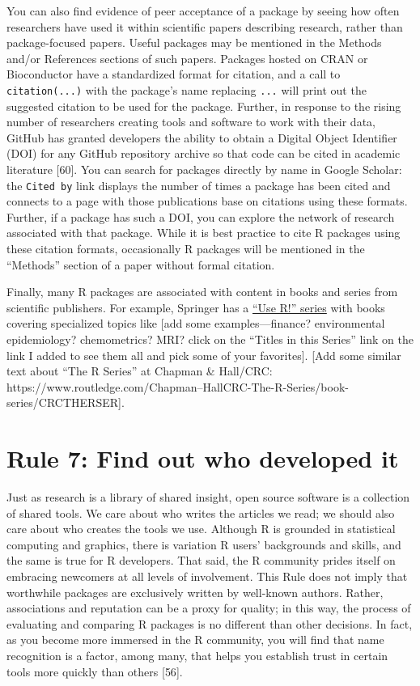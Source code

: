 \documentclass[10pt,letterpaper]{article}
\begin{document}
You can also find evidence of peer acceptance of a package by seeing how
often researchers have used it within scientific papers describing
research, rather than package-focused papers. Useful packages may be
mentioned in the Methods and/or References sections of such papers.
Packages hosted on CRAN or Bioconductor have a standardized format for
citation, and a call to \texttt{citation(...)} with the package's name
replacing \texttt{...} will print out the suggested citation to be used
for the package. Further, in response to the rising number of
researchers creating tools and software to work with their data, GitHub
has granted developers the ability to obtain a Digital Object Identifier
(DOI) for any GitHub repository archive so that code can be cited in
academic literature {[}60{]}. You can search for packages directly by
name in Google Scholar: the \texttt{Cited\ by} link displays the number
of times a package has been cited and connects to a page with those
publications base on citations using these formats. Further, if a
package has such a DOI, you can explore the network of research
associated with that package. While it is best practice to cite R
packages using these citation formats, occasionally R packages will be
mentioned in the ``Methods'' section of a paper without formal citation.

Finally, many R packages are associated with content in books and series
from scientific publishers. For example, Springer has a
\href{https://www.springer.com/series/6991}{``Use R!'' series} with
books covering specialized topics like {[}add some examples---finance?
environmental epidemiology? chemometrics? MRI? click on the ``Titles in
this Series'' link on the link I added to see them all and pick some of
your favorites{]}. {[}Add some similar text about ``The R Series'' at
Chapman \& Hall/CRC:
https://www.routledge.com/Chapman--HallCRC-The-R-Series/book-series/CRCTHERSER{]}.

\hypertarget{rule-7-find-out-who-developed-it}{%
\section{Rule 7: Find out who developed
it}\label{rule-7-find-out-who-developed-it}}

Just as research is a library of shared insight, open source software is
a collection of shared tools. We care about who writes the articles we
read; we should also care about who creates the tools we use. Although R
is grounded in statistical computing and graphics, there is variation R
users' backgrounds and skills, and the same is true for R developers.
That said, the R community prides itself on embracing newcomers at all
levels of involvement. This Rule does not imply that worthwhile packages
are exclusively written by well-known authors. Rather, associations and
reputation can be a proxy for quality; in this way, the process of
evaluating and comparing R packages is no different than other
decisions. In fact, as you become more immersed in the R community, you
will find that name recognition is a factor, among many, that helps you
establish trust in certain tools more quickly than others {[}56{]}.
\end{document}
